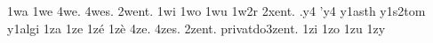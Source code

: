 {%
1wa
1we
4we.
4wes.
2went. %
1wi
1wo
1wu
1w2r
2xent. %
.y4
'y4
                    y1asth
                    y1s2tom
                    y1algi
1za
1ze
1zé
1zè
4ze.
4zes.
        2zent.
privatdo3zent.
%
1zi
1zo
1zu
1zy
}

